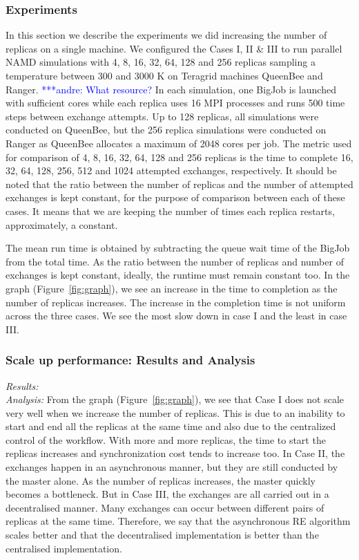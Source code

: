 \documentclass{rspublic}
\newcommand{\alnote}[1]{ {\textcolor{blue} { ***andre: #1 }}}
\newcommand{\alnote}[1]{}
\begin{document}
\subsubsection{Experiments}
In this section we describe the experiments we did increasing the
number of replicas on a single machine. We configured the Cases I, II
\& III to run parallel NAMD simulations with 4, 8, 16, 32, 64, 128 and
256 replicas sampling a temperature between 300 and 3000 K on Teragrid
machines QueenBee and Ranger. \alnote{What resource?} In each
simulation, one BigJob is launched with sufficient cores while each
replica uses 16 MPI processes and runs 500 time steps between exchange
attempts. Up to 128 replicas, all simulations were conducted on
QueenBee, but the 256 replica simulations were conducted on Ranger as
QueenBee allocates a maximum of 2048 cores per job. The metric used
for comparison of 4, 8, 16, 32, 64, 128 and 256 replicas is the time
to complete 16, 32, 64, 128, 256, 512 and 1024 attempted exchanges,
respectively. It should be noted that the ratio between the number of
replicas and the number of attempted exchanges is kept constant, for
the purpose of comparison between each of these cases. It means that
we are keeping the number of times each replica restarts,
approximately, a constant.

The mean run time is obtained by subtracting the queue wait time of
the BigJob from the total time. As the ratio between the number of
replicas and number of exchanges is kept constant, ideally, the
runtime must remain constant too. In the graph
(Figure~\ref{fig:graph}), we see an increase in the time to completion
as the number of replicas increases. The increase in the completion
time is not uniform across the three cases. We see the most slow down
in case I and the least in case III.

\subsubsection{Scale up performance: Results and Analysis}

{\it Results:}\\

{\it Analysis: } From the graph (Figure~\ref{fig:graph}), we see that
Case I does not scale very well when we increase the number of
replicas. This is due to an inability to start and end all the
replicas at the same time and also due to the centralized control of the workflow. With more and more replicas, the time to start the replicas increases  and 
synchronization cost tends to increase too.  In Case II, the exchanges happen in
an asynchronous manner, but they are still conducted by the master
alone. As the number of replicas increases, the master quickly becomes
a bottleneck. But in Case III, the exchanges are all carried out in a
decentralised manner. Many exchanges can occur between different pairs
of replicas at the same time. Therefore, we say that the asynchronous
RE algorithm scales better and that the decentralised implementation
is better than the centralised implementation.
\end{document}
